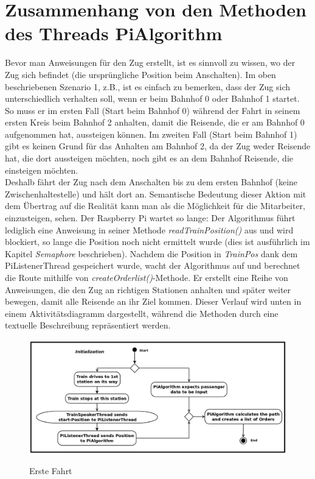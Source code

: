 \section{Zusammenhang von den Methoden des Threads PiAlgorithm}
Bevor man Anweisungen für den Zug erstellt, ist es sinnvoll zu wissen, wo der Zug sich befindet (die ursprüngliche Position beim Anschalten). Im oben beschriebenen Szenario 1, z.B., ist es einfach zu bemerken, dass der Zug sich unterschiedlich verhalten soll, wenn er beim Bahnhof 0 oder Bahnhof 1 startet. So muss er im ersten Fall (Start beim Bahnhof 0) während der Fahrt in seinem ersten Kreis beim Bahnhof 2 anhalten, damit die Reisende, die er am Bahnhof 0 aufgenommen hat, aussteigen können. Im zweiten Fall (Start beim Bahnhof 1) gibt es keinen Grund für das Anhalten am Bahnhof 2, da der Zug weder Reisende hat, die dort aussteigen möchten, noch gibt es an dem Bahnhof Reisende, die einsteigen möchten.\\
Deshalb fährt der Zug nach dem Anschalten bis zu dem ersten Bahnhof (keine Zwischenhaltestelle) und hält dort an. Semantische Bedeutung dieser Aktion mit dem Übertrag auf die Realität kann man als die Möglichkeit für die Mitarbeiter, einzusteigen, sehen. Der Raspberry Pi wartet so lange: Der Algorithmus führt lediglich eine Anweisung in seiner Methode \textit{readTrainPosition()} aus und wird blockiert, so lange die Position noch nicht ermittelt wurde (dies ist ausführlich im Kapitel \textit{Semaphore} beschrieben). Nachdem die Position in \textit{TrainPos} dank dem PiListenerThread gespeichert wurde, wacht der Algorithmus auf und berechnet die Route mithilfe von \textit{createOrderlist()}-Methode. Er erstellt eine Reihe von Anweisungen, die den Zug an richtigen Stationen anhalten und später weiter bewegen, damit alle Reisende an ihr Ziel kommen. Dieser Verlauf wird unten in einem Aktivitätsdiagramm dargestellt, während die Methoden durch eine textuelle Beschreibung repräsentiert werden.\\
\begin{figure}[H]	
\caption{Erste Fahrt}
\includegraphics[width=2\textwidth, width=470pt]{content/images/Act-dia1.png}
\label{pic:init}
\end{figure}
